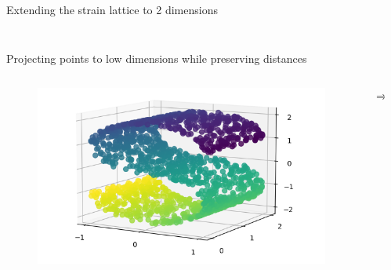 \documentclass{beamer}
\begin{document}
\begin{frame}{Extending the strain lattice to 2 dimensions}
\begin{columns}
\begin{column}{0.5\textwidth}
\begin{figure}
            \end{figure}
        \end{column}
    \end{columns}
    \centering
    \vfill
    \tiny{\cite{gogDynamicsSelectionManystrain2002}}

\end{frame}


%         



\begin{frame}{Projecting points to low dimensions while preserving distances}
    \begin{columns}
        \begin{column}{0.4\textwidth}
            \begin{figure}
                \includegraphics[width=1.4\textwidth]{standalone/mds_1.png}
                
            \end{figure}   
        \end{column}
        \begin{column}{0.01\textwidth}
            \huge{$\Longrightarrow$}
            
        \end{column}
        \begin{column}{0.4\textwidth}
            
        \end{column}
    \end{columns}
    \centering
    \vfill
    \tiny{\cite{scikit-learn}}
\end{frame}
\end{document}
